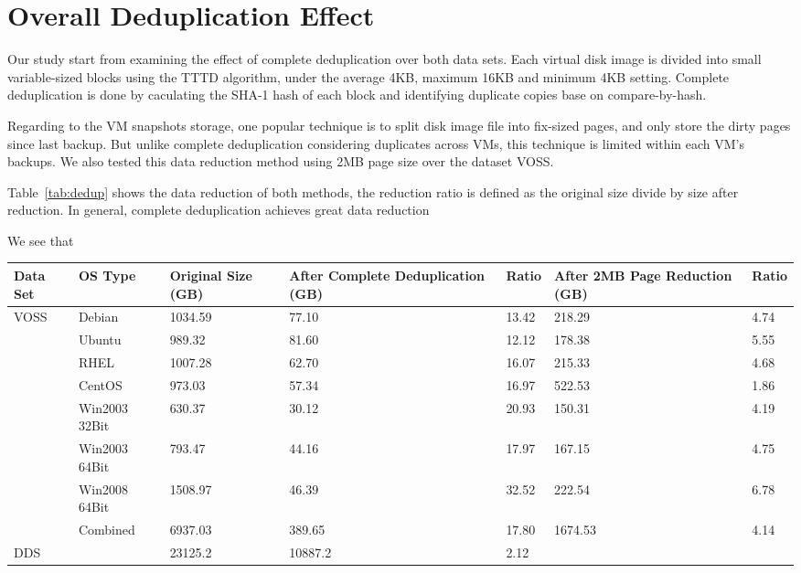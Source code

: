 \section{Overall Deduplication Effect}
Our study start from examining the effect of complete deduplication over both data sets.
Each virtual disk image is divided into small variable-sized blocks using the TTTD algorithm\cite{frame05},
under the average 4KB, maximum 16KB and minimum 4KB setting. Complete deduplication is
done by caculating the SHA-1 hash of each block and identifying duplicate copies base on compare-by-hash.

Regarding to the VM snapshots storage, one popular technique is to split disk image file into fix-sized
pages, and only store the dirty pages since last backup. But unlike complete deduplication considering duplicates
across VMs, this technique is limited within each VM's backups. We also tested this data reduction method
using 2MB page size over the dataset VOSS. 

Table~\ref{tab:dedup} shows the data reduction of both methods, 
the reduction ratio is defined as the original size divide by size after reduction.
In general, complete deduplication achieves great data reduction

We see that 

\begin{table*}[htb]
  \centering
    \begin{tabular}{|l|l|p{0.8in}|p{1.1in}|p{0.3in}|p{0.9in}|p{0.3in}|}
        \hline
        Data Set & OS Type & Original Size \newline (GB) & After Complete \newline Deduplication (GB) & Ratio & After 2MB Page \newline Reduction (GB) & Ratio \\ \hline
        \multirow{8}{*}{VOSS} & Debian & 1034.59 & 77.10 & 13.42 & 218.29 & 4.74 \\ \cline{2-7}
         & Ubuntu & 989.32 & 81.60 & 12.12 & 178.38 & 5.55 \\ \cline{2-7}
         & RHEL & 1007.28 & 62.70 & 16.07 & 215.33 & 4.68 \\ \cline{2-7}
         & CentOS & 973.03 & 57.34 & 16.97 & 522.53 & 1.86 \\ \cline{2-7}
         & Win2003 32Bit & 630.37 & 30.12 & 20.93 & 150.31 & 4.19 \\ \cline{2-7}
         & Win2003 64Bit & 793.47 & 44.16 & 17.97 & 167.15 & 4.75 \\ \cline{2-7}
         & Win2008 64Bit & 1508.97 & 46.39 & 32.52 & 222.54 & 6.78 \\ \cline{2-7}
         & Combined & 6937.03 & 389.65 & 17.80 & 1674.53 & 4.14 \\ \hline
        DDS & ~ & 23125.2 & 10887.2 & 2.12 & ~ & ~ \\
        \hline
    \end{tabular}
    \caption{Data reduction via complete deduplication and dirty page reduction}
    \label{tab:dedup}
\end{table*}

